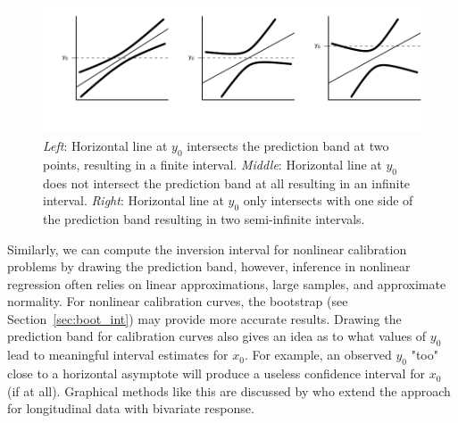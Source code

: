 \documentclass[cmfont,usenames,dvipsnames,leqno]{afit-etd}\usepackage[]{graphicx}\usepackage[]{color}
\makeatletter
\def\maxwidth{ %
  \ifdim\Gin@nat@width>\linewidth
    \linewidth
  \else
    \Gin@nat@width
  \fi
}
\newenvironment{knitrout}{}{} %
\renewenvironment{knitrout}{\begin{singlespace}}{\end{singlespace}}
\makeatother
\begin{document}
\begin{knitrout}
\color{fgcolor}\begin{figure}[H]

\includegraphics[width=\maxwidth]{figure/bands} \caption[Common prediction band shapes]{\textit{Left}: Horizontal line at $y_0$ intersects the prediction band at two points, resulting in a finite interval. \textit{Middle}: Horizontal line at $y_0$ does not intersect the prediction band at all resulting in an infinite interval. \textit{Right}: Horizontal line at $y_0$ only intersects with one side of the prediction band resulting in two semi-infinite intervals.\label{fig:bands}}
\end{figure}


\end{knitrout}


Similarly, we can compute the inversion interval for nonlinear calibration problems by drawing the prediction band, however, inference in nonlinear regression often relies on linear approximations, large samples, and approximate normality. For nonlinear calibration curves, the bootstrap (see Section~\ref{sec:boot_int}) may provide more accurate results. Drawing the prediction band for calibration curves also gives an idea as to what values of $y_0$ lead to meaningful interval estimates for $x_0$. For example, an observed $y_0$ "too" close to a horizontal asymptote will produce a useless confidence interval for $x_0$ (if at all). Graphical methods like this are discussed by \citet{jones_approximate_2009} who extend the approach for longitudinal data with bivariate response.

\end{document}
